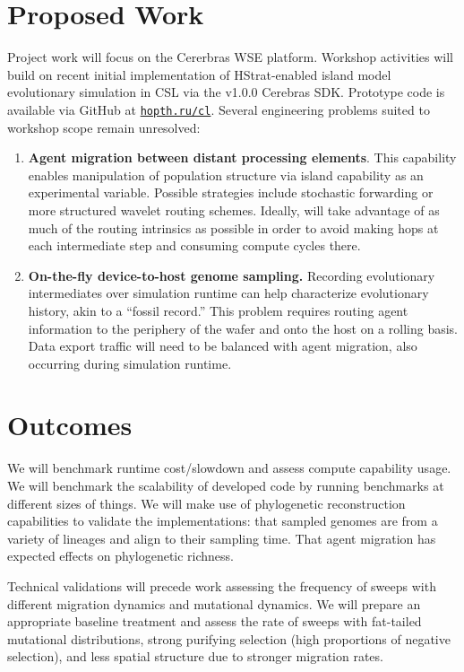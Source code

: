\section{Proposed Work}

Project work will focus on the Cererbras WSE platform.
Workshop activities will build on recent initial implementation of HStrat-enabled island model evolutionary simulation in CSL via the v1.0.0 Cerebras SDK.
Prototype code is available via GitHub at \texttt{\href{https://hopth.ru/cl}{hopth.ru/cl}}.
Several engineering problems suited to workshop scope remain unresolved:
\begin{enumerate}
\item \textbf{Agent migration between distant processing elements}.
This capability enables manipulation of population structure via island capability as an experimental variable.
Possible strategies include stochastic forwarding or more structured wavelet routing schemes.
Ideally, will take advantage of as much of the routing intrinsics as possible in order to avoid making hops at each intermediate step and consuming compute cycles there.

\item \textbf{On-the-fly device-to-host genome sampling.}
Recording evolutionary intermediates over simulation runtime can help characterize evolutionary history, akin to a ``fossil record.''
This problem requires routing agent information to the periphery of the wafer and onto the host on a rolling basis.
Data export traffic will need to be balanced with agent migration, also occurring during simulation runtime.
\end{enumerate}

\section{Outcomes}

We will benchmark runtime cost/slowdown and assess compute capability usage.
We will benchmark the scalability of developed code by running benchmarks at different sizes of things.
We will make use of phylogenetic reconstruction capabilities to validate the implementations: that sampled genomes are from a variety of lineages and align to their sampling time.
That agent migration has expected effects on phylogenetic richness.

Technical validations will precede work assessing the frequency of sweeps with different migration dynamics and mutational dynamics.
We will prepare an appropriate baseline treatment and assess the rate of sweeps with fat-tailed mutational distributions, strong purifying selection (high proportions of negative selection), and less spatial structure due to stronger migration rates.

